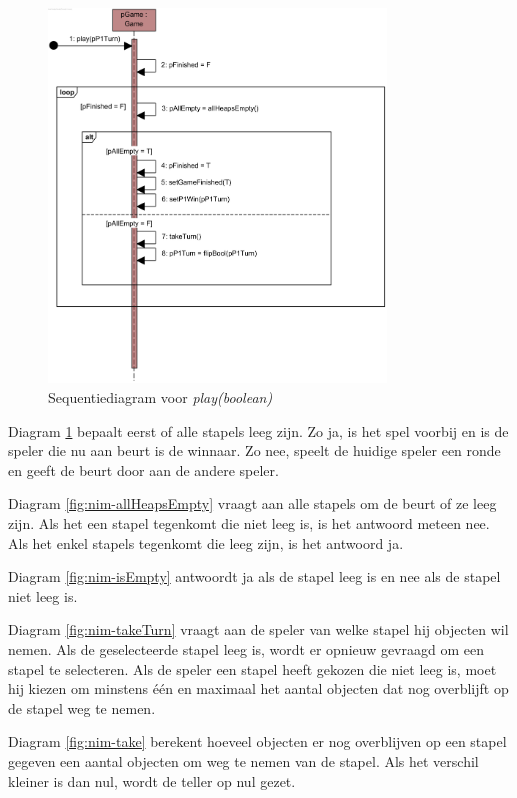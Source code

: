 \begin{figure}
	\centering
	\includegraphics[width=0.8\textwidth]{chap-evaluatie/play.png}
	\caption{Sequentiediagram voor \textit{play(boolean)}}
	\label{fig:nim-play}
\end{figure}

Diagram \ref{fig:nim-play} bepaalt eerst of alle stapels leeg zijn. Zo ja, is het spel voorbij en is de speler die nu aan beurt is de winnaar. Zo nee, speelt de huidige speler een ronde en geeft de beurt door aan de andere speler.

Diagram \ref{fig:nim-allHeapsEmpty} vraagt aan alle stapels om de beurt of ze leeg zijn. Als het een stapel tegenkomt die niet leeg is, is het antwoord meteen nee. Als het enkel stapels tegenkomt die leeg zijn, is het antwoord ja.

Diagram \ref{fig:nim-isEmpty} antwoordt ja als de stapel leeg is en nee als de stapel niet leeg is.

Diagram \ref{fig:nim-takeTurn} vraagt aan de speler van welke stapel hij objecten wil nemen. Als de geselecteerde stapel leeg is, wordt er opnieuw gevraagd om een stapel te selecteren. Als de speler een stapel heeft gekozen die niet leeg is, moet hij kiezen om minstens \'e\'en en maximaal het aantal objecten dat nog overblijft op de stapel weg te nemen.

Diagram \ref{fig:nim-take} berekent hoeveel objecten er nog overblijven op een stapel gegeven een aantal objecten om weg te nemen van de stapel. Als het verschil kleiner is dan nul, wordt de teller op nul gezet.

